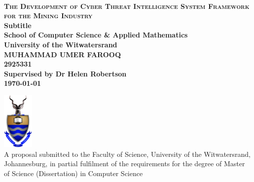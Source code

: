 \documentclass[a4paper,twoside,12pt]{report}
\begin{document}
\onecolumn
\thispagestyle{empty}

\setcounter{page}{0}
\ 
\begin{center}
  \vfill
  {
  \huge \bf \textsc{The Development of Cyber Threat Intelligence System Framework for the Mining Industry}\\
  \large Subtitle\\[20pt]
  \large School of Computer Science \& Applied Mathematics\\
  \large University of the Witwatersrand\\[20pt]
  \normalsize
  MUHAMMAD UMER FAROOQ\\
  2925331\\[20pt]
  Supervised by Dr Helen Robertson\\[10pt]
  \today
  }

  \vfill
  \vfill
  \includegraphics[width=1.5cm]{images/wits.png}
  \vspace{10pt}\\
  \small{A proposal submitted to the Faculty of Science, University of the Witwatersrand, Johannesburg,
in partial fulfilment of the requirements for the degree of Master of Science (Dissertation) in Computer Science}\\
\end{center}
\vfill
\newpage

\pagestyle{plain}
\setcounter{page}{1}
\end{document}
